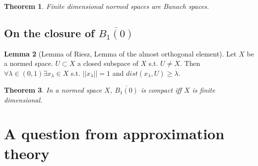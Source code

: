 \documentclass[a4paper, 12pt]{article}
\theoremstyle{plain}
\newtheorem{theorem}{Theorem}[subsection] %
\theoremstyle{definition}
\theoremstyle{lemma}
\newtheorem{lemma}[theorem]{Lemma}
\theoremstyle{remark}
\theoremstyle{corollary}
\theoremstyle{example}
\begin{document}
	\begin{theorem}
		Finite dimensional normed spaces are Banach spaces.
	\end{theorem}

	\subsection{On the closure of $\overline{B_1(0)}$}
	\begin{lemma}[Lemma of Riesz, Lemma of the almost orthogonal element]
		Let $X$ be a normed space. $U \subset X$ a closed subspace of $X$ s.t. $U \neq X$. Then $\forall \lambda \in (0,1) \exists x_\lambda \in X$ s.t. $||x_\lambda|| = 1$ and $dist(x_\lambda, U) \geq \lambda$.
	\end{lemma}
	\begin{theorem}
		In a normed space $X$, $\overline{B_1(0)}$ is compact iff $X$ is finite dimensional.
	\end{theorem}

	\section{A question from approximation theory}
\end{document}
